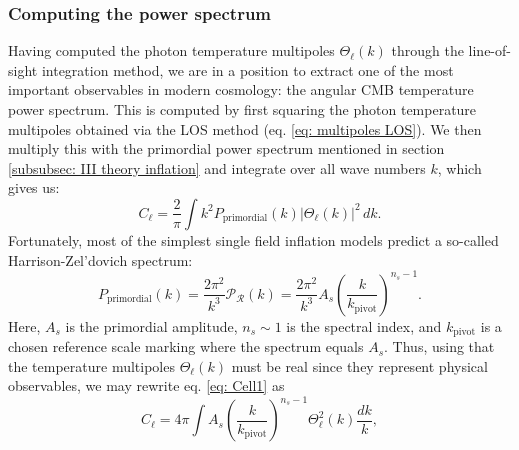 \documentclass{aa}
\numberwithin{equation}{section}
\numberwithin{table}{section}
\numberwithin{figure}{section}
\begin{document}
\subsubsection{Computing the power spectrum}\label{subsubsec: IV theory CMB}
Having computed the photon temperature multipoles $\Theta_\ell(k)$ through the line-of-sight integration method, we are in a position to extract one of the most important observables in modern cosmology: the angular CMB temperature power spectrum. 
This is computed by first squaring the photon temperature multipoles obtained via the LOS method (eq. \eqref{eq: multipoles LOS}). We then multiply this with the primordial power spectrum mentioned in section \ref{subsubsec: III theory inflation} and integrate over all wave numbers $k$, which gives us:
\begin{equation}
    C_\ell = \frac{2}{\pi} \int k^2 P_\text{primordial}(k) \left| \Theta_\ell(k) \right|^2 \, dk. \label{eq: Cell1}
\end{equation}
Fortunately, most of the simplest single field inflation models predict a so-called Harrison-Zel'dovich spectrum:
\begin{equation}
  P_\text{primordial}(k) = \frac{2\pi^2}{k^3}\mathcal{P}_{\mathcal{R}}(k) = \frac{2\pi^2}{k^3}A_s \left( \frac{k}{k_\text{pivot}} \right)^{n_s - 1}. \label{eq: primordial}
\end{equation}
Here, $A_s$ is the primordial amplitude, $n_s\sim1$ is the spectral index, and $k_\text{pivot}$ is a chosen reference scale marking where the spectrum equals $A_s$. Thus, using that the temperature multipoles $\Theta_\ell(k)$ must be real since they represent physical observables, we may rewrite eq. \eqref{eq: Cell1} as
\begin{equation}
  C_\ell = 4\pi \int  A_s\left( \frac{k}{k_\text{pivot}} \right)^{n_s - 1} \Theta^2_\ell(k) \frac{dk}{k}, \label{eq: Cell2}
\end{equation}

\end{document}
